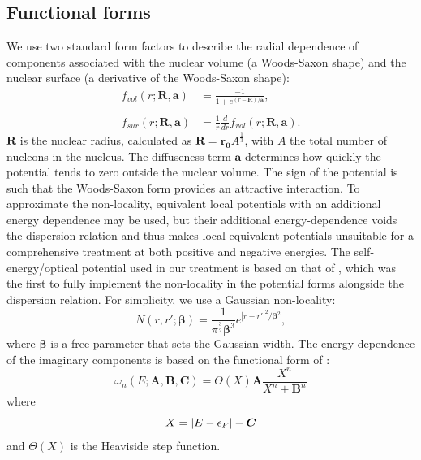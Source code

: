 \subsection{Functional forms}
We use two standard form factors
to describe the radial dependence of components
associated with the nuclear volume (a Woods-Saxon shape)
and the nuclear surface (a derivative of the Woods-Saxon shape):
\begin{equation} \label{WoodsSaxon}
    \begin{split}
        f_{vol}(r; \bm{R}, \bm{a}) & = \frac{-1}{1+e^{(r-\bm{R})/\bm{a}}},\\
        \\
        f_{sur}(r; \bm{R}, \bm{a}) & = \frac{1}{r}\frac{d}{dr}f_{vol}(r; \bm{R},
        \bm{a}).
    \end{split}
\end{equation}
$\bm{R}$ is the nuclear radius, calculated as $\bm{R} = \bm{r_{0}}A^{\frac{1}{3}}$, with $A$ the total number of
nucleons in the nucleus. The diffuseness term $\bm{a}$ determines how quickly the potential tends to
zero outside the nuclear volume.
The sign of the potential is such that the Woods-Saxon form
provides an attractive interaction.
To approximate the non-locality, equivalent local potentials \cite{Mahaux1991}
with an additional energy dependence may be used, but their additional energy-dependence
voids the dispersion relation and thus makes local-equivalent potentials unsuitable
for a comprehensive treatment at both positive and negative energies.
The self-energy/optical potential used in our treatment is based on that of
\cite{MahzoonPhDThesis}, which was the first to fully implement the non-locality in the potential
forms alongside the dispersion relation. For simplicity, we use a Gaussian non-locality:
\begin{equation}
    N(r, r';\bm{\beta}) = \frac{1}{\pi^{\frac{3}{2}}\bm{\beta}^{3}}
    e^{|r-r'|^{2}/{\bm{\beta}^{2}}},
\end{equation}
where $\bm{\beta}$ is a free parameter that sets the Gaussian width. The energy-dependence of the
imaginary components is based on the functional form of \cite{Charity2006}:
\begin{equation} \label{omega}
    \omega_{n}(E; \bm{A}, \bm{B}, \bm{C}) = \Theta(X)\bm{A}\frac{X^{n}}{X^{n}+\bm{B}^{n}}
\end{equation}
where
\begin{equation*}
    X = |E-\epsilon_{F}|-\bm{C}\\
\end{equation*}
and $\Theta(X)$ is the Heaviside step function. 

